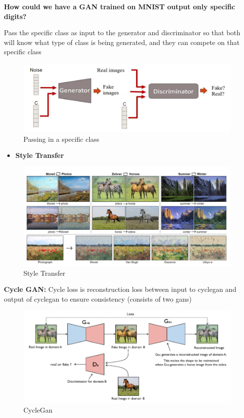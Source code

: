\begin{example}

\textbf{How could we have a GAN trained on MNIST output only specific digits?}

Pass the specific class as input to the generator and discriminator so that both will know what type of class is being generated, and they can compete on that specific class

\end{example}

\begin{figure}[h!t]
    \centering
    \includegraphics[width=0.75\linewidth]{mnstcongen.png}
    \caption{Passing in a specific class}
    \label{fig:enter-label}
\end{figure}

\begin{itemize}
    \item \textbf{Style Transfer}
\end{itemize}

\begin{figure}[h!t]
    \centering
    \includegraphics[width=1\linewidth]{styletransfer.png}
    \caption{Style Transfer}
    \label{fig:enter-label}
\end{figure}

\textbf{Cycle GAN:} Cycle loss is reconstruction loss between input to cyclegan and output of cyclegan to ensure consistency (consists of two gans)

\begin{figure}[h!t]
    \centering
    \includegraphics[width=1\linewidth]{cyclegan.png}
    \caption{CycleGan}
    \label{fig:enter-label}
\end{figure}

